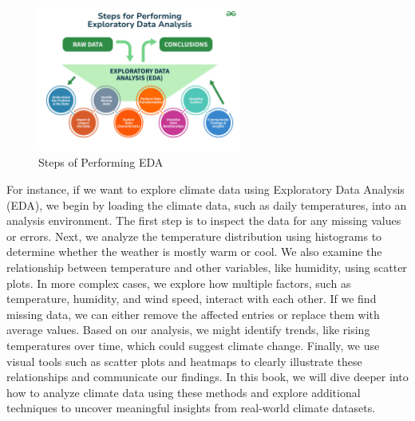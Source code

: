 \begin{figure}[h]
\centering
\includegraphics[width=0.6\textwidth]{figures/eda.png}
\caption{Steps of Performing EDA }
\end{figure}
For instance, if we want to explore climate data using Exploratory Data Analysis (EDA), we begin by loading the climate data, such as daily temperatures, into an analysis environment. The first step is to inspect the data for any missing values or errors. Next, we analyze the temperature distribution using histograms to determine whether the weather is mostly warm or cool. We also examine the relationship between temperature and other variables, like humidity, using scatter plots. In more complex cases, we explore how multiple factors, such as temperature, humidity, and wind speed, interact with each other. If we find missing data, we can either remove the affected entries or replace them with average values. Based on our analysis, we might identify trends, like rising temperatures over time, which could suggest climate change. Finally, we use visual tools such as scatter plots and heatmaps to clearly illustrate these relationships and communicate our findings. 
In this book, we will dive deeper into how to analyze climate data using these methods and explore additional techniques to uncover meaningful insights from real-world climate datasets.

